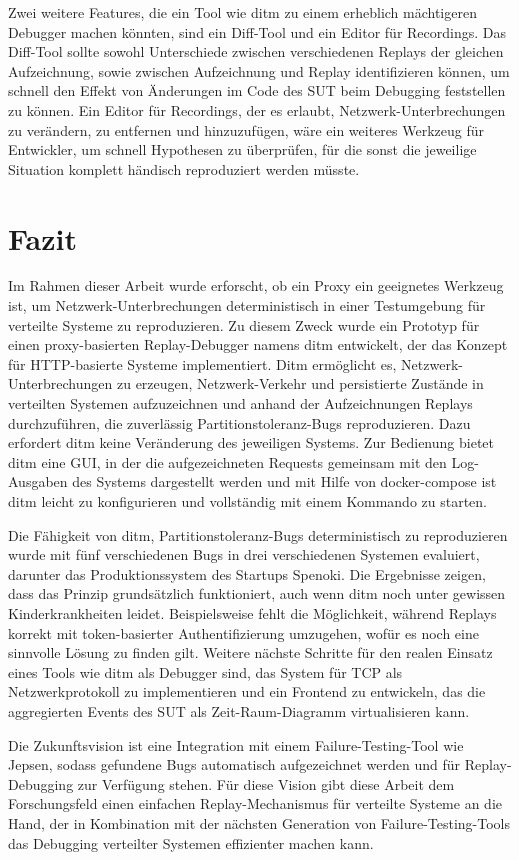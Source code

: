 \documentclass[12pt,a4paper]{report}
\begin{document}
Zwei weitere Features, die ein Tool wie ditm zu einem erheblich mächtigeren Debugger machen könnten, sind ein Diff-Tool und ein
Editor für Recordings. Das Diff-Tool sollte sowohl Unterschiede zwischen verschiedenen Replays der gleichen Aufzeichnung, sowie
zwischen Aufzeichnung und Replay identifizieren können, um schnell den Effekt von Änderungen im Code des SUT beim Debugging
feststellen zu können. Ein Editor für Recordings, der es erlaubt, Netzwerk-Unterbrechungen zu verändern, zu entfernen und
hinzuzufügen, wäre ein weiteres Werkzeug für Entwickler, um schnell Hypothesen zu überprüfen, für die sonst die jeweilige
Situation komplett händisch reproduziert werden müsste.



\chapter{Fazit}
Im Rahmen dieser Arbeit wurde erforscht, ob ein Proxy ein geeignetes Werkzeug ist, um Netzwerk-Unterbrechungen deterministisch in
einer Testumgebung für verteilte Systeme zu reproduzieren. Zu diesem Zweck wurde ein Prototyp für einen proxy-basierten
Replay-Debugger namens ditm entwickelt, der das Konzept für HTTP-basierte Systeme implementiert. Ditm ermöglicht es,
Netzwerk-Unterbrechungen zu erzeugen, Netzwerk-Verkehr und persistierte Zustände in verteilten Systemen aufzuzeichnen und anhand der
Aufzeichnungen Replays durchzuführen, die zuverlässig Partitionstoleranz-Bugs reproduzieren. Dazu erfordert ditm keine Veränderung
des jeweiligen Systems. Zur Bedienung bietet ditm eine GUI, in der die aufgezeichneten Requests gemeinsam mit den Log-Ausgaben des
Systems dargestellt werden und mit Hilfe von docker-compose ist ditm leicht zu konfigurieren und vollständig mit einem Kommando zu
starten.

Die Fähigkeit von ditm, Partitionstoleranz-Bugs deterministisch zu reproduzieren wurde mit fünf verschiedenen Bugs in drei verschiedenen Systemen
evaluiert, darunter das Produktionssystem des Startups Spenoki. Die Ergebnisse zeigen, dass das Prinzip grundsätzlich funktioniert, auch wenn
ditm noch unter gewissen Kinderkrankheiten leidet. Beispielsweise fehlt die Möglichkeit, während Replays korrekt mit token-basierter
Authentifizierung umzugehen, wofür es noch eine sinnvolle Lösung zu finden gilt. Weitere nächste Schritte für den realen Einsatz
eines Tools wie ditm als Debugger sind, das System für TCP als Netzwerkprotokoll zu implementieren und ein Frontend zu entwickeln,
das die aggregierten Events des SUT als Zeit-Raum-Diagramm virtualisieren kann.

Die Zukunftsvision ist eine Integration mit einem Failure-Testing-Tool wie Jepsen, sodass gefundene Bugs automatisch aufgezeichnet
werden und für Replay-Debugging zur Verfügung stehen. Für diese Vision gibt diese Arbeit dem Forschungsfeld einen einfachen
Replay-Mechanismus für verteilte Systeme an die Hand, der in Kombination mit der nächsten Generation von Failure-Testing-Tools das
Debugging verteilter Systemen effizienter machen kann.

\printbibliography

\setlength{\parskip}{0em}
\listoffigures
\listoftables
\lstlistoflistings
\end{document}
